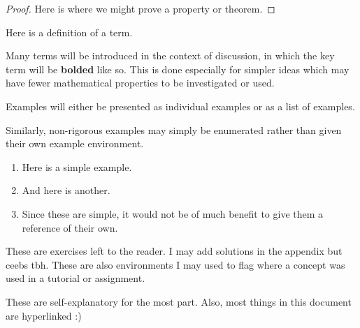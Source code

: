 \begin{proof}%
    Here is where we might prove a property or theorem. 
\end{proof}


\begin{definition}
    Here is a definition of a term. 
\end{definition}
Many terms will be introduced in the context of discussion, 
in which the key term will be \textbf{bolded} like so. 
This is done especially for simpler ideas which may have 
fewer mathematical properties to be investigated 
or used. 

\begin{example}
    Examples will either be presented as individual 
    examples or as a list of examples. 
\end{example}
Similarly, non-rigorous examples may simply be enumerated 
rather than given their own example environment. 
\begin{enumerate}
    \item Here is a simple example. 
    \item And here is another. 
    \item Since these are simple, it would not be 
    of much benefit to give them a reference of their own.
\end{enumerate}
\begin{exercise}
    These are exercises left to the reader. I may add solutions 
    in the appendix but ceebs tbh. These are also environments I may used to flag where a concept was used in a tutorial or assignment. 
\end{exercise}

These are self-explanatory for the most part. 
Also, most things in this document are hyperlinked :)